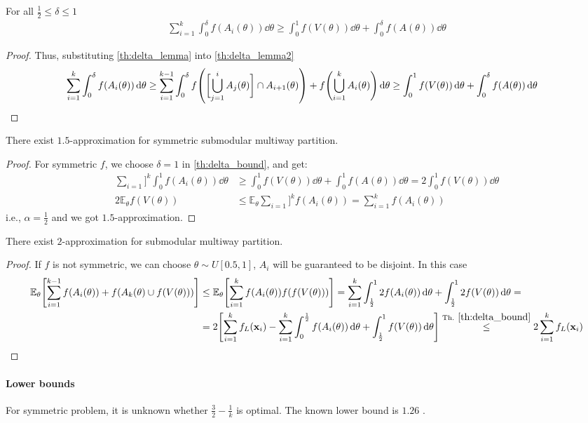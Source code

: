 \begin{theorem} \label{th:delta_bound}
	For all $\frac{1}{2} \leq \delta \leq 1$
	\begin{align}
	\sum_{i=1}^k \int_0^\delta f(A_i(\theta)) \dd{\theta} \geq \int_0^1 f(V(\theta)) \dd{\theta} + \int_0^\delta f(A(\theta))\dd{\theta}
	\end{align}
	\begin{proof}
		Thus, substituting \vref{th:delta_lemma} into \vref{th:delta_lemma2}
		\begin{align}
		\sum_{i=1}^k \int_0^\delta f(A_i(\theta)) \dd{\theta} &\geq \sum_{i=1}^{k-1} \int_0^\delta f\qty(\qty\bigg[ \bigcup_{j=1}^{i} A_j(\theta)] \cap A_{i+1}(\theta))  +  f\qty(\bigcup_{i=1}^k A_i(\theta) )\dd{\theta}  \geq \int_0^1 f(V(\theta)) \dd{\theta} + \int_0^\delta f\qty(A(\theta) ) \dd{\theta}
		\end{align}
	\end{proof}
\end{theorem}
\begin{theorem}
	There exist $1.5$-approximation for symmetric submodular multiway partition.
	\begin{proof}
	For symmetric $f$, we choose $\delta = 1$ in \cref{th:delta_bound}, and get:
	\begin{align}
	\sum_{i=1}]^k \int_0^1 f(A_i(\theta)) \dd{\theta} &\geq \int_0^1 f(V(\theta)) \dd{\theta} + \int_0^1 f(A(\theta))\dd{\theta} = 2\int_0^1 f(V(\theta)) \dd{\theta}\\ 
	2\mathbb{E}_\theta f(V(\theta)) &\leq  \mathbb{E}_\theta  \sum_{i=1}]^k  f(A_i(\theta)) =  \sum_{i=1}^{k} f(A_i(\theta))  
	\end{align}
	i.e., $\alpha = \frac{1}{2}$ and we got $1.5$-approximation.
	\end{proof}
\end{theorem}

\begin{theorem}
	There exist $2$-approximation for submodular multiway partition.
		\begin{proof}
If $f$ is not symmetric, we can choose $\theta\sim U[0.5,1]$, $A_i$ will be guaranteed to be disjoint. In this case
\begin{align}
\mathbb{E}_\theta \qty[\sum_{i=1}^{k-1} f(A_i(\theta)) + f(A_k(\theta) \cup f(V(\theta))) ] &\leq\mathbb{E}_\theta \qty[\sum_{i=1}^{k} f(A_i(\theta))  f(f(V(\theta))) ] = \sum_{i=1}^k \int_{\frac{1}{2}}^{1} 2 f(A_i(\theta))\dd{\theta} + \int_{\frac{1}{2}}^{1} 2 f(V(\theta)) \dd{\theta}  =\\&=
 2\qty[\sum_{i=1}^k f_L(\vb{x}_i) - \sum_{i=1}^k \int_0^{\frac{1}{2}}  f(A_i(\theta))\dd{\theta} + \int_{\frac{1}{2}}^{1}  f(V(\theta)) \dd{\theta}] \stackrel{\text{Th. }\ref{th:delta_bound}}{\leq} 2 \sum_{i=1}^k f_L(\vb{x}_i)
\end{align}	\end{proof}
\end{theorem}

\paragraph{Lower bounds} For symmetric problem, it is unknown whether $\frac{3}{2} - \frac{1}{k}$ is optimal. The known lower bound is $1.26$ \cite{ene2013local}.

